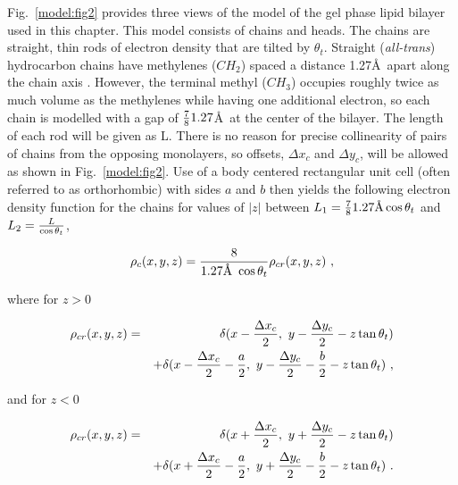 Fig.\ \ref{model:fig2} provides three views of the model of the gel phase lipid bilayer
used in this chapter.  This model consists of chains and heads.
The chains are straight, thin rods of electron density that are tilted
by ${\theta}_{t}$.  Straight ({\it all-trans}) hydrocarbon chains have
methylenes ($CH_{2}$) spaced a distance 1.27\AA ~apart along the
chain axis \cite{Bunn}.  However, the terminal methyl ($CH_{3}$) occupies roughly 
twice as much volume as the methylenes \cite{NW88,WW5} while having one additional 
electron, so each chain is modelled with a gap of \( {7 \over 8} 1.27\)\AA~at 
the center of the bilayer. The length of each rod will be given as L.
There is no reason for precise collinearity of pairs of chains from the opposing
monolayers, so offsets, $\Delta x_{c}$ and $\Delta y_{c}$, will be allowed
as shown in Fig.\ \ref{model:fig2}.
Use of a body centered rectangular unit cell (often referred to as orthorhombic)
with sides $a$ and
$b$ then yields the following electron density function for the
chains for values of $|z|$ between \( L_{1}={7 \over 8} 1.27\mbox{\AA} \cos {\theta}_{t} 
\) and 
\( L_{2}={L \over \cos {\theta}_{t}} \),

\begin{equation}
\label{et1}
{\rho}_{c}(x,y,z) = {8 \over 1.27\mbox{\AA}~\cos {\theta}_{t}} {\rho}_{cr}(x,y,z)~,
\end{equation}

where for \( z > 0 \)

\begin{eqnarray*} {\rho}_{cr}(x,y,z) =&& \delta (x - {\Delta x_{c} \over 2},~ y - 
{\Delta y_{c} \over 2} - z 
\tan {\theta}_{t}) \\
&&+ \delta (x -{\Delta x_{c} \over 2} - {a \over 2},~ y - {\Delta y_{c} 
\over 2} - {b \over 2} - z \tan {\theta}_{t})~,
\end{eqnarray*}

and for \( z < 0 \)

\begin{eqnarray*} {\rho}_{cr}(x,y,z) =&& \delta (x + {\Delta x_{c} \over 2},~ y + 
{\Delta y_{c} \over 2} - z 
\tan {\theta}_{t}) \\
&& + \delta (x + {\Delta x_{c} \over 2} - {a \over 2},~ y + {\Delta y_{c} 
\over 2} - {b \over 2} - z \tan {\theta}_{t})~. 
\end{eqnarray*}

